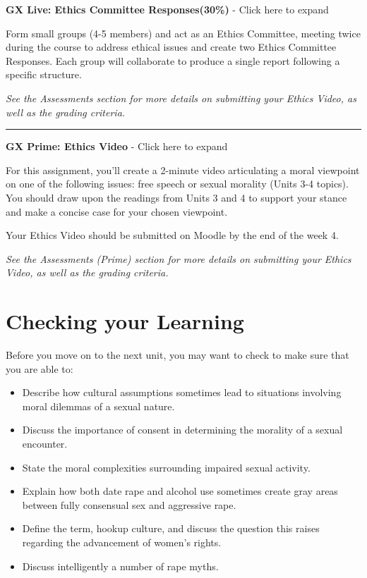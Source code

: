 \documentclass[
]{book}
\providecommand{\tightlist}{%
  \setlength{\itemsep}{0pt}\setlength{\parskip}{0pt}}
\begin{document}
\begin{assessment}
\textbf{GX Live: Ethics Committee Responses(30\%)} - Click here to expand

Form small groups (4-5 members) and act as an Ethics Committee, meeting twice during the course to address ethical issues and create two Ethics Committee Responses. Each group will collaborate to produce a single report following a specific structure.

\emph{See the Assessments section for more details on submitting your Ethics Video, as well as the grading criteria.}

\begin{center}\rule{0.5\linewidth}{0.5pt}\end{center}

\textbf{GX Prime: Ethics Video} - Click here to expand

For this assignment, you'll create a 2-minute video articulating a moral viewpoint on one of the following issues: free speech or sexual morality (Units 3-4 topics). You should draw upon the readings from Units 3 and 4 to support your stance and make a concise case for your chosen viewpoint.

Your Ethics Video should be submitted on Moodle by the end of the week 4.

\emph{See the Assessments (Prime) section for more details on submitting your Ethics Video, as well as the grading criteria.}
\end{assessment}

\hypertarget{checking-your-learning-3}{%
\section*{Checking your Learning}\label{checking-your-learning-3}}

\begin{progress}
Before you move on to the next unit, you may want to check to make sure that you are able to:

\begin{itemize}
\tightlist
\item
  Describe how cultural assumptions sometimes lead to situations involving moral dilemmas of a sexual nature.
\item
  Discuss the importance of consent in determining the morality of a sexual encounter.
\item
  State the moral complexities surrounding impaired sexual activity.
\item
  Explain how both date rape and alcohol use sometimes create gray areas between fully consensual sex and aggressive rape.
\item
  Define the term, hookup culture, and discuss the question this raises regarding the advancement of women's rights.
\item
  Discuss intelligently a number of rape myths.
\end{itemize}
\end{progress}
\end{document}
